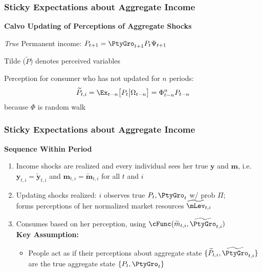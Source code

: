 \documentclass{beamer}\usepackage{dcolumn}
\newcommand{\jemph}[1]{{\color{StataDarkBlue}#1}}
\newcommand{\jbemph}[1]{\textbf{\color{SlideNavy}#1}}
\providecommand{\perc}[1]{\widetilde{#1}}
\providecommand{\jemph}[1]{{\color{jirkasblue}#1}}
\begin{document}
\begin{frame}
\frametitle{Sticky Expectations about Aggregate Income}

\jbemph{\large Calvo Updating of Perceptions of Aggregate Shocks}\\
\bi
\item {\it True} Permanent income: ${P}_{t+1} =  \PtyGro_{t+1} {P}_{t}\Psi_{t+1}$\\
\item Tilde ($\perc{P}$) denotes perceived variables
\item \jemph{Perception for consumer who has not updated for $n$ periods:}
$$
  \perc{P}_{t,i}=\Ex_{t-n}\big[P_t\big\vert\Omega_{t-n}\big]=\Phi_{t-n}^nP_{t-n}
$$
because $\Phi$ is random walk 
\ei
\end{frame}



\begin{frame}
\frametitle{Sticky Expectations about Aggregate Income}

\jbemph{\large Sequence Within Period}\\
\begin{enumerate}
\setlength{\itemsep}{2mm}
\item Income shocks are realized and every individual sees her true $\mathbf{y}$ and $\mathbf{m}$,
i.e.\ $\mathbf{y}_{t,i}=\perc{\mathbf{y}}_{t,i}$ and $\mathbf{m}_{t,i}=\perc{\mathbf{m}}_{t,i}$ for all $t$ and $i$

\item Updating shocks realized: $i$ observes true $P_t, \PtyGro_t$ w/ prob $\Pi$;\\
forms perceptions of her normalized market resources $\perc{\mLev}_{t,i}$

\item Consumes based on her perception, \jemph{using $\cFunc(\perc{m}_{t,i},\perc{\PtyGro}_{t,i})$}\\[1mm]

  \jemph{\textbf{Key Assumption:}}\\
    \begin{itemize}
    \item  People act as if their perceptions about aggregate state $\{\perc{P}_{t,i},\perc{\PtyGro}_{t,i}\}$
are the true aggregate state $\{P_t,\PtyGro_t\}$
    \end{itemize}

\end{enumerate}

\end{frame}
\end{document}
